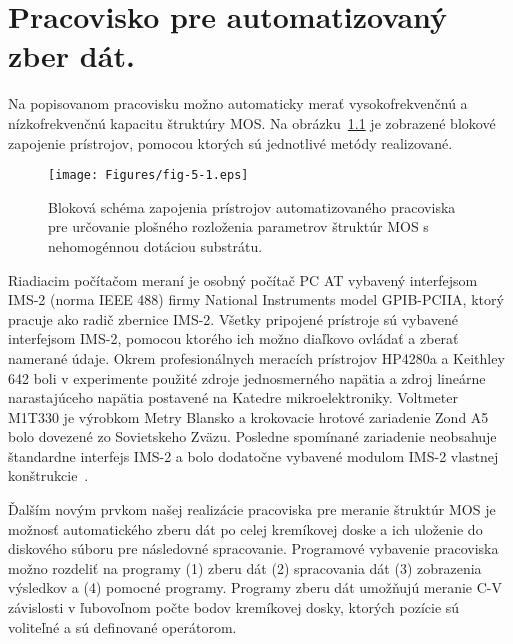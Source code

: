 
\chapter{Pracovisko pre automatizovaný zber dát.}\label{Chapter5}

Na popisovanom pracovisku možno automaticky merať vysokofrekvenčnú a
nízkofrekvenčnú kapacitu štruktúry MOS\@. Na obrázku~\ref{fig:5.1} je
zobrazené blokové zapojenie prístrojov, pomocou ktorých sú jednotlivé
metódy realizované.

\begin{figure}[h!]\centering
  \texttt{[image: Figures/fig-5-1.eps]}%
  \caption[Bloková schéma zapojenia prístrojov automatizovaného
    pracoviska]{Bloková schéma zapojenia prístrojov automatizovaného
    pracoviska pre určovanie plošného rozloženia parametrov štruktúr
    MOS s nehomogénnou dotáciou substrátu.}\label{fig:5.1}
\end{figure}

Riadiacim počítačom meraní je osobný počítač PC AT vybavený
interfejsom IMS-2 (norma IEEE 488) firmy National Instruments model
GPIB-PCIIA, ktorý pracuje ako radič zbernice IMS-2. Všetky pripojené
prístroje sú vybavené interfejsom IMS-2, pomocou ktorého ich možno
diaľkovo ovládať a zberať namerané údaje. Okrem profesionálnych
meracích prístrojov HP4280a a Keithley 642 boli v experimente použité
zdroje jednosmerného napätia a zdroj lineárne narastajúceho napätia
postavené na Katedre mikroelektroniky. Voltmeter M1T330 je výrobkom
Metry Blansko a krokovacie hrotové zariadenie Zond A5 bolo dovezené zo
Sovietskeho Zväzu. Posledne spomínané zariadenie neobsahuje štandardne
interfejs IMS-2 a bolo dodatočne vybavené modulom IMS-2 vlastnej
konštrukcie~\cite{5.1}.

Ďalším novým prvkom našej realizácie pracoviska pre meranie štruktúr
MOS je možnosť automatického zberu dát po celej kremíkovej doske a ich
uloženie do diskového súboru pre následovné spracovanie. Programové
vybavenie pracoviska možno rozdeliť na programy (1) zberu dát (2)
spracovania dát (3) zobrazenia výsledkov a (4) pomocné
programy. Programy zberu dát umožňujú meranie C-V závislosti v
ľubovoľnom počte bodov kremíkovej dosky, ktorých pozície sú voliteľné
a sú definované operátorom.

